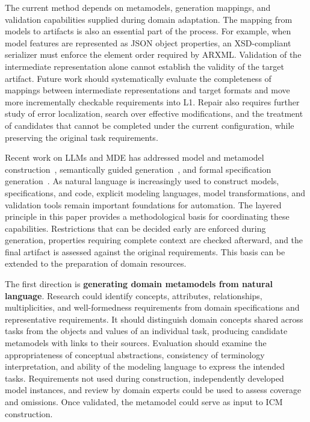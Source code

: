 \documentclass[pdflatex,iicol,sn-mathphys-num]{sn-jnl}
\newcommand{\paperref}[1]{~\citep{#1}}
\begin{document}
The current method depends on metamodels, generation mappings, and validation capabilities supplied during domain adaptation. The mapping from models to artifacts is also an essential part of the process. For example, when model features are represented as JSON object properties, an XSD-compliant serializer must enforce the element order required by ARXML. Validation of the intermediate representation alone cannot establish the validity of the target artifact. Future work should systematically evaluate the completeness of mappings between intermediate representations and target formats and move more incrementally checkable requirements into L1. Repair also requires further study of error localization, search over effective modifications, and the treatment of candidates that cannot be completed under the current configuration, while preserving the original task requirements.

Recent work on LLMs and MDE has addressed model and metamodel construction\paperref{JOT:issue_2026_03/a8}, semantically guided generation\paperref{Chen_2026}, and formal specification generation\paperref{Ma_2025b}. As natural language is increasingly used to construct models, specifications, and code, explicit modeling languages, model transformations, and validation tools remain important foundations for automation. The layered principle in this paper provides a methodological basis for coordinating these capabilities. Restrictions that can be decided early are enforced during generation, properties requiring complete context are checked afterward, and the final artifact is assessed against the original requirements. This basis can be extended to the preparation of domain resources.

The first direction is \textbf{generating domain metamodels from natural language}. Research could identify concepts, attributes, relationships, multiplicities, and well-formedness requirements from domain specifications and representative requirements. It should distinguish domain concepts shared across tasks from the objects and values of an individual task, producing candidate metamodels with links to their sources. Evaluation should examine the appropriateness of conceptual abstractions, consistency of terminology interpretation, and ability of the modeling language to express the intended tasks. Requirements not used during construction, independently developed model instances, and review by domain experts could be used to assess coverage and omissions. Once validated, the metamodel could serve as input to ICM construction.
\end{document}
